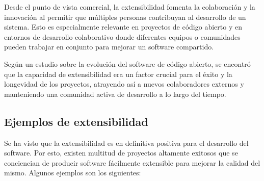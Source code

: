 Desde el punto de vista comercial, la extensibilidad fomenta la colaboración y la innovación al permitir que múltiples personas contribuyan al desarrollo de un sistema. Esto es especialmente relevante en proyectos de código abierto y en entornos de desarrollo colaborativo donde diferentes equipos o comunidades pueden trabajar en conjunto para mejorar un software compartido.

Según un estudio \citep{mockus2002two} sobre la evolución del software de código abierto, se encontró que la capacidad de extensibilidad era un factor crucial para el éxito y la longevidad de los proyectos, atrayendo así a nuevos colaboradores externos y manteniendo una comunidad activa de desarrollo a lo largo del tiempo.

\subsection{Ejemplos de extensibilidad}

Se ha visto que la extensibilidad es en definitiva positiva para el desarrollo del software. Por esto, existen multitud de proyectos altamente exitosos que se conciencian de producir software fácilmente extensible para mejorar la calidad del mismo. Algunos ejemplos son los siguientes:

